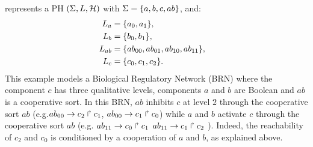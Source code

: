 \begin{example}
 represents a PH $(\Sigma,L,\mathcal{H})$ with $\Sigma = \{a,b,c,ab\}$, and:
\begin{align*}
L_a &= \{a_0,a_1\},\\
L_b &= \{b_0, b_1\},\\
L_{ab} &= \{ab_{00}, ab_{01}, ab_{10}, ab_{11}\},&\\
L_c &= \{c_0, c_1, c_2\}.
\end{align*}
This example models a Biological Regulatory Network (BRN) where the component $c$ has three qualitative levels, components $a$ and $b$ are Boolean and $ab$ is a cooperative sort.
In this BRN, $ab$ inhibits $c$ at level $2$ through the cooperative sort $ab$ (e.g.$ab_{00}\rightarrow c_2\Rsh c_1$, $ab_{00}\rightarrow c_1\Rsh c_0$) while $a$ and $b$ activate $c$  
through the cooperative sort $ab$ (e.g. $ab_{11}\rightarrow c_0\Rsh c_1$ $ab_{11}\rightarrow c_1\Rsh c_2$ ). Indeed, the reachability of $c_2$ and $c_0$ 
is conditioned by a cooperation of $a$ and $b$, as explained above.

\begin{figure}[!t]
\begin{minipage}{0.3\linewidth}
\centering
{}
\end{minipage}
\begin{minipage}{0.7\linewidth}
\centering
{}
\end{minipage}
\end{figure}
\end{example}
